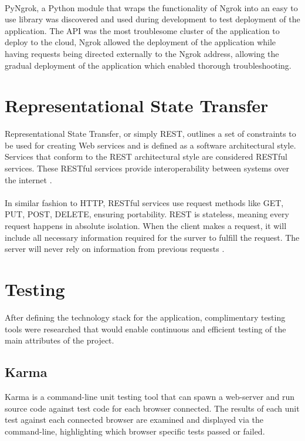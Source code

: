 \paragraph{}
PyNgrok, a Python module that wraps the functionality of Ngrok into an easy to use library was discovered and used during development to test deployment of the application. The API was the most troublesome cluster of the application to deploy to the cloud, Ngrok allowed the deployment of the application while having requests being directed externally to the Ngrok address, allowing the gradual deployment of the application which enabled thorough troubleshooting.

\section{Representational State Transfer}
Representational State Transfer, or simply REST, outlines a set of constraints to be used for creating Web services and is defined as a software architectural style. Services that conform to the REST architectural style are considered RESTful services. These RESTful services provide interoperability between systems over the internet \cite{REST}.

\paragraph{}
In similar fashion to HTTP, RESTful services use request methods like GET, PUT, POST, DELETE, ensuring portability. REST is stateless, meaning  every request happens in absolute isolation. When the client makes a request, it will include all necessary information required for the surver to fulfill the request. The server will never rely on information from previous requests \cite{REST_STATE}.

\section{Testing}
After defining the technology stack for the application, complimentary testing tools were researched that would enable continuous and efficient testing of the main attributes of the project.

\subsection{Karma}
Karma is a command-line unit testing tool that can spawn a web-server and run source code against test code for each browser connected. The results of each unit test against each connected browser are examined and displayed via the command-line, highlighting which browser specific tests passed or failed.

